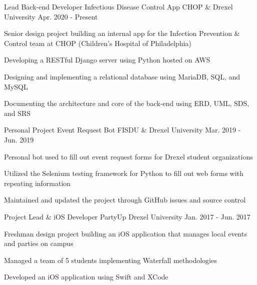 

\begin{cventries}

  \cventry
    {Lead Back-end Developer} %
    {Infectious Disease Control App} %
    {CHOP \& Drexel University} %
    {Apr. 2020 - Present} %
    {
      \begin{cvitems} %
        \item Senior design project building an internal app for the Infection Prevention \& Control team at CHOP (Children's Hospital of Philadelphia)
        \item Developing a RESTful Django server using Python hosted on AWS
        \item Designing and implementing a relational database using MariaDB, SQL, and MySQL
        \item Documenting the architecture and core of the back-end using ERD, UML, SDS, and SRS
      \end{cvitems}
    }

  \cventry
    {Personal Project} %
    {Event Request Bot} %
    {FISDU \& Drexel University} %
    {Mar. 2019 - Jun. 2019} %
    {
      \begin{cvitems} %
        \item Personal bot used to fill out event request forms for Drexel student organizations
        \item Utilized the Selenium testing framework for Python to fill out web forms with repeating information
        \item Maintained and updated the project through GitHub issues and source control
      \end{cvitems}
    }

  \cventry
    {Project Lead \& iOS Developer} %
    {PartyUp} %
    {Drexel University} %
    {Jan. 2017 - Jun. 2017} %
    {
      \begin{cvitems} %
        \item Freshman design project building an iOS application that manages local events and parties on campus
        \item Managed a team of 5 students implementing Waterfall methodologies
        \item Developed an iOS application using Swift and XCode
      \end{cvitems}
    }

\end{cventries}